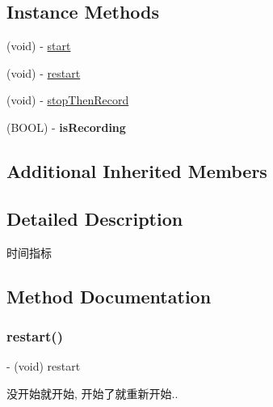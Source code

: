 \subsection*{Instance Methods}
\begin{DoxyCompactItemize}
\item 
(void) -\/ \mbox{\hyperlink{interface_alibc_trade_time_measure_ac6f4cc06c43caef66a49528c0a70ec4b}{start}}
\item 
(void) -\/ \mbox{\hyperlink{interface_alibc_trade_time_measure_a871b4ff71d7d05520521c79b8b982648}{restart}}
\item 
(void) -\/ \mbox{\hyperlink{interface_alibc_trade_time_measure_ad3bd1ef0cba36ac5f948c8c60227bf60}{stop\+Then\+Record}}
\item 
\mbox{\label{interface_alibc_trade_time_measure_a1803210bf80d7c2371b8979df393d892}} 
(B\+O\+OL) -\/ {\bfseries is\+Recording}
\end{DoxyCompactItemize}
\subsection*{Additional Inherited Members}


\subsection{Detailed Description}
时间指标 

\subsection{Method Documentation}
\mbox{\label{interface_alibc_trade_time_measure_a871b4ff71d7d05520521c79b8b982648}} 
\subsubsection{\texorpdfstring{restart()}{restart()}}
{\footnotesize\ttfamily -\/ (void) restart \begin{DoxyParamCaption}{ }\end{DoxyParamCaption}}

没开始就开始, 开始了就重新开始.. \mbox{\label{interface_alibc_trade_time_measure_ac6f4cc06c43caef66a49528c0a70ec4b}} 
